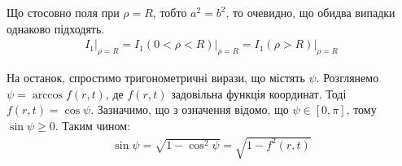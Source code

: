 Що стосовно поля при $ \rho = R $, тобто $ a^2 = b^2 $, то очевидно, що обидва 
випадки однаково підходять.
%
\begin{equation*} \begin{aligned}
\left. I_1 \right|_{\rho = R} = 
\left. I_1 \left(0 < \rho < R \right) \right|_{\rho = R} =
\left. I_1 \left( \rho > R \right) \right|_{\rho = R}
\end{aligned} \end{equation*}

На останок, спростимо тригонометричні вирази, що містять $ \psi $. Розглянемо 
$ \psi = \arccos f(r,t) $, де $ f(r,t) $ задовільна функція координат. 
Тоді $ f(r,t) = \cos \psi $. Зазначимо, що з означення відомо, що 
$ \psi \in \left[ 0, \pi \right] $, тому $ \sin \psi \geq 0 $. Таким чином:
%
\begin{equation*} \begin{aligned}
\sin \psi = \sqrt{1 - \cos^2{\psi}} = \sqrt{1 - f^2(r,t)}
\end{aligned} \end{equation*}


